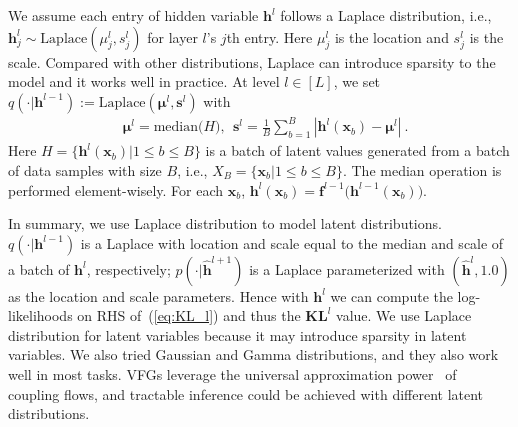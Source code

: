 \documentclass[sigconf, anonymous, review]{acmart}
\theoremstyle{plain}
\theoremstyle{definition}
\theoremstyle{remark}
\begin{document}
 We assume each entry of  hidden variable $\mathbf{h}^{l}$ follows a Laplace distribution, i.e., $\mathbf{h}_j^{l} \sim \text{Laplace}(\mu_j^{l}, s_j^{l})$ for layer $l$'s $j$th entry. Here $\mu_j^{l}$ is the location and $s_j^{l}$ is the scale. Compared with other distributions, Laplace can introduce sparsity to the model and it works well in practice. At level $l \in [L]$, we set $q(\cdot|\mathbf{h}^{l-1}) := \text{Laplace}(\mathbf{\mu}^l, \mathbf{s}^l)$ with
\begin{align}\label{eq:posteriorapp}
&\mathbf{\mu}^l = \text{median}\big(H\big), \ \  \mathbf{s}^l =\frac{1}{B}\sum_{b=1}^B|\mathbf{h}^l(\mathbf{x}_b) - \mathbf{\mu}^l| \ .
\end{align}
Here $H=\{\mathbf{h}^l(\mathbf{x}_b)| 1\leqslant b \leqslant B\}$ is a batch of latent values generated from a batch of data samples with size $B$, i.e., $X_{B} = \{\mathbf{x}_b | 1\leqslant b \leqslant B\}$. The median operation is performed element-wisely. For each $\mathbf{x}_b$, $\mathbf{h}^l(\mathbf{x}_b)=\mathbf{f}^{l-1}\big(\mathbf{h}^{l-1}(\mathbf{x}_b)\big)$.

In summary, we use Laplace distribution to model latent distributions. $q(\cdot|\mathbf{h}^{l-1})$ is a Laplace with location and scale equal to the median and scale of a batch of $\mathbf{h}^{l}$, respectively; $p(\cdot|\widehat{\mathbf{h}}^{l+1})$ is a  Laplace parameterized  with  $(\widehat{\mathbf{h}}^{l}, 1.0)$ as the location and scale parameters. Hence with $\mathbf{h}^{l}$ we can compute the log-likelihoods on RHS of~(\ref{eq:KL_l}) and thus the $\mathbf{KL}^l$ value. We use Laplace distribution for latent variables because it may introduce sparsity in latent variables. We also tried Gaussian and Gamma distributions, and they also work well in most tasks. VFGs leverage the universal approximation power~\cite{teshima2020coupling} of coupling flows, and tractable inference could be achieved with different latent distributions. 
\end{document}
